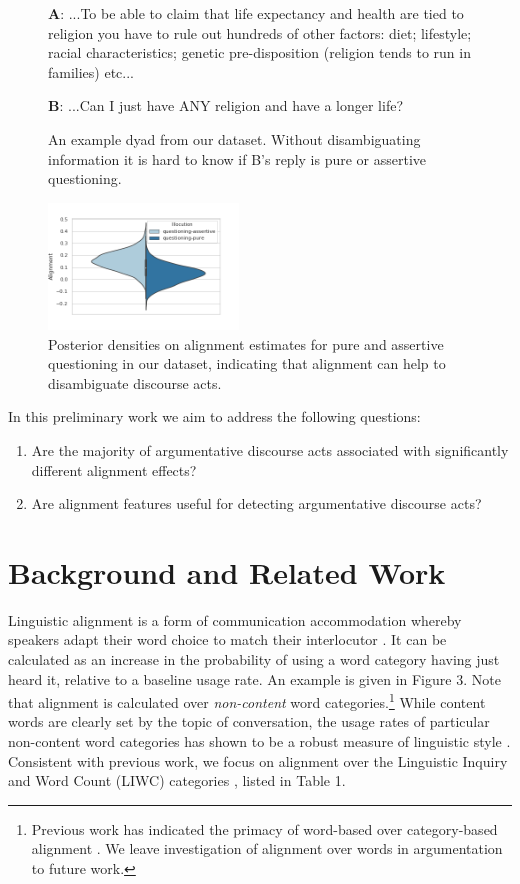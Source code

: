 \documentclass[11pt,a4paper]{article}
\begin{document}
\begin{figure}[t]
\small
$\mathbf{A}$: ...To be able to claim that life expectancy and health are tied to religion you have to rule out hundreds of other factors: diet; lifestyle; racial characteristics; genetic pre-disposition (religion tends to run in families) etc...

\vspace{6pt}

$\mathbf{B}$: ...Can I just have ANY religion and have a longer life?
\caption{An example dyad from our dataset. Without disambiguating information it is hard to know if B's reply is pure or assertive questioning.}
\end{figure}

\begin{figure}[t]
\centering
\includegraphics[width=0.45\textwidth]{compare_dists.png}
\caption{Posterior densities on alignment estimates for pure and assertive questioning in our dataset, indicating that alignment can help to disambiguate discourse acts.}
\end{figure}

In this preliminary work we aim to address the following questions:

\begin{enumerate}
    \item Are the majority of argumentative discourse acts associated with significantly different alignment effects?
    \item Are alignment features useful for detecting argumentative discourse acts?
\end{enumerate}

\section{Background and Related Work}

Linguistic alignment is a form of communication accommodation \cite{GilesCC91} whereby speakers adapt their word choice to match their interlocutor \cite{NiederhofferP02}. It can be calculated as an increase in the probability of using a word category having just heard it, relative to a baseline usage rate. An example is given in Figure 3. Note that alignment is calculated over \textit{non-content} word categories.\footnote{Previous work has indicated the primacy of word-based over category-based alignment \cite{DoyleF16}. We leave investigation of alignment over words in argumentation to future work.} While content words are clearly set by the topic of conversation, the usage rates of particular non-content word categories has shown to be a robust measure of linguistic style \cite{PennebakerK00}. Consistent with previous work, we focus on alignment over the Linguistic Inquiry and Word Count (LIWC) categories \cite{PennebakerBJB15}, listed in Table 1.
\end{document}
